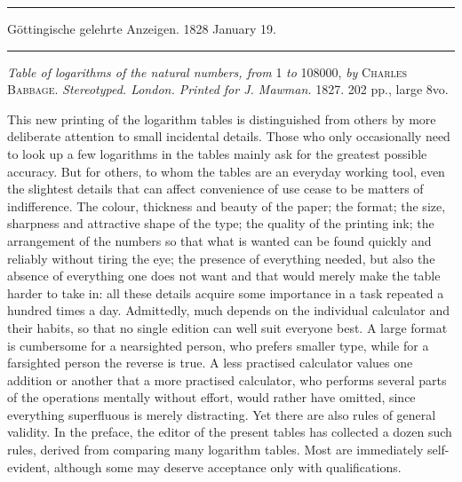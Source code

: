 \clearpage{}
\par{}\begin{center}\rule{0.7\linewidth}{0.4pt}\par Göttingische gelehrte Anzeigen. 1828 January 19.\par\rule{0.7\linewidth}{0.4pt}\end{center}

\noindent\textit{Table of logarithms of the natural numbers, from} 1 \textit{to} 108000, \textit{by} \textsc{Charles}
\textsc{Babbage.} \textit{Stereotyped. London. Printed for J. Mawman.} 1827. 202 pp., large 8vo.

This new printing of the logarithm tables is distinguished from others by more deliberate attention to small incidental details. Those who only occasionally need to look up a few logarithms in the tables mainly ask for the greatest possible accuracy. But for others, to whom the tables are an everyday working tool, even the slightest details that can affect convenience of use cease to be matters of indifference. The colour, thickness and beauty of the paper; the format; the size, sharpness and attractive shape of the type; the quality of the printing ink; the arrangement of the numbers so that what is wanted can be found quickly and reliably without tiring the eye; the presence of everything needed, but also the absence of everything one does not want and that would merely make the table harder to take in: all these details acquire some importance in a task repeated a hundred times a day. Admittedly, much depends on the individual calculator and their habits, so that no single edition can well suit everyone best. A large format is cumbersome for a nearsighted person, who prefers smaller type, while for a farsighted person the reverse is true. A less practised calculator values one addition or another that a more practised calculator, who performs several parts of the operations mentally without effort, would rather have omitted, since everything superfluous is merely distracting. Yet there are also rules of general validity. In the preface, the editor of the present tables has collected a dozen such rules, derived from comparing many logarithm tables. Most are immediately self-evident, although some may deserve acceptance only with qualifications.

